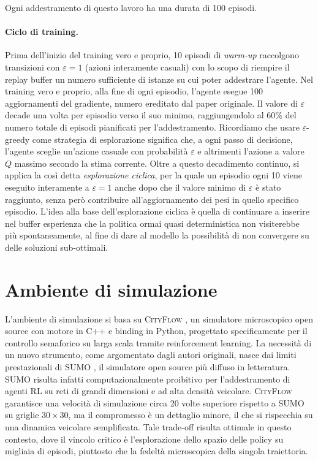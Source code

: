 Ogni addestramento di questo lavoro ha una durata di 100 episodi.


\paragraph{Ciclo di training.}
Prima dell'inizio del training vero e proprio,
10 episodi di \emph{warm-up} raccolgono transizioni con $\varepsilon=1$
(azioni interamente casuali) con lo scopo di riempire il replay buffer un numero
sufficiente di istanze su cui poter addestrare l'agente.
Nel training vero e proprio, alla fine di ogni episodio, l'agente esegue 100 aggiornamenti del gradiente,
numero ereditato dal paper originale. Il valore di $\varepsilon$ decade una
volta per episodio verso il suo minimo, raggiungendolo al 60\% del numero totale
di episodi pianificati per l'addestramento.
Ricordiamo che usare $\varepsilon$-greedy come strategia di esplorazione significa che, a ogni passo di
decisione, l'agente sceglie un'azione casuale con probabilità $\varepsilon$
e altrimenti l'azione a valore $Q$ massimo secondo la stima corrente.
Oltre a questo decadimento continuo, si applica la così detta \emph{esplorazione ciclica}, per la quale un episodio ogni 10 viene eseguito
interamente a $\varepsilon=1$ anche dopo che il valore minimo di
$\varepsilon$ è stato raggiunto, senza però contribuire all'aggiornamento dei pesi in quello specifico episodio.
L'idea alla base dell'esplorazione ciclica è quella di continuare a inserire nel buffer esperienza che la politica
ormai quasi deterministica non visiterebbe più spontaneamente, al fine di
dare al modello la possibilità di non convergere su delle soluzioni sub-ottimali.

\section{Ambiente di simulazione}
\label{sec:ambiente}

L'ambiente di simulazione si basa su \textsc{CityFlow} \citep{zhang2019cityflow}, un simulatore microscopico open source con motore in C++ e binding in Python,
progettato specificamente per il controllo semaforico su larga scala tramite reinforcement learning.
La necessità di un nuovo strumento, come argomentato dagli autori originali, nasce dai limiti prestazionali di SUMO \citep{lopez2018sumo},
il simulatore open source più diffuso in letteratura.
SUMO risulta infatti computazionalmente proibitivo per l'addestramento di agenti RL su reti di grandi dimensioni e ad alta densità veicolare.
\textsc{CityFlow} garantisce una velocità di simulazione circa 20 volte superiore rispetto a SUMO su griglie $30\times30$,
ma il compromesso è un dettaglio minore, il che si rispecchia su una dinamica veicolare semplificata.
Tale trade-off risulta ottimale in questo contesto, dove il vincolo critico è l'esplorazione dello spazio delle policy su migliaia di episodi,
piuttosto che la fedeltà microscopica della singola traiettoria.

